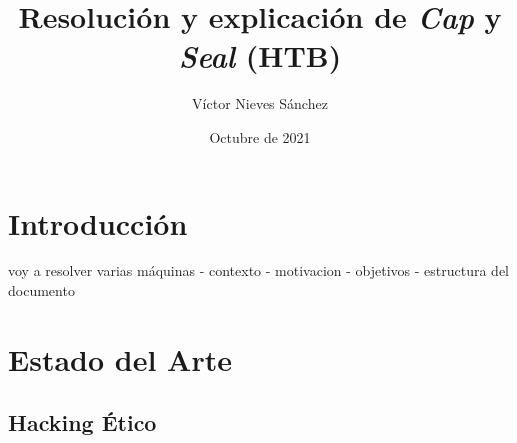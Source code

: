 \documentclass[a4paper, 12pt]{article} %
\author{Víctor Nieves Sánchez}
\date{Octubre de 2021}
\title{Resolución y explicación de \textit{Cap} y \textit{Seal} (\acrshort{HTB})}
\begin{document}
\maketitle
\null
\newpage
\begin{otherlanguage}{spanish}



    \newpage
    \tableofcontents

    \newpage
    \listoffigures

    \newpage
    \renewcommand{\listtablename}{Lista de Tablas}
    \listoftables

    \newpage
    \lstlistoflistings

    \newpage
    \printglossary[type=\acronymtype]

    \newpage
    \begin{abstract}
        \normalsize
        
    \end{abstract}

    \newpage
        \renewcommand{\spanishabstractname}{Abstract}
        \begin{abstract}
            \normalsize
            
        \end{abstract}
    \newpage

    \section{Introducción}
        voy a resolver varias máquinas
        - contexto
        - motivacion
        - objetivos
        - estructura del documento
    
    \newpage
    \section{Estado del Arte}
    
    \subsection{Hacking Ético}
    
    

\end{otherlanguage}
\end{document}
